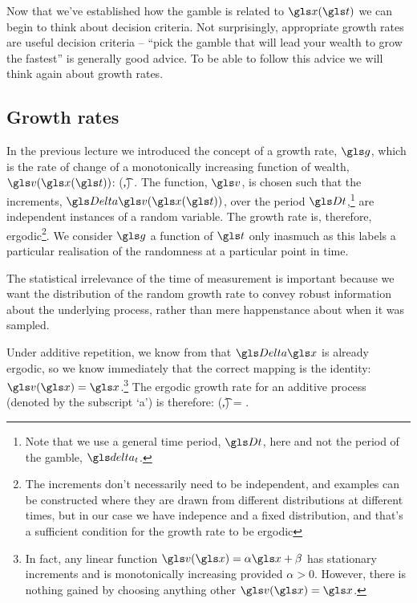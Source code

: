 Now that we've established how the gamble is related to $\x(\t)$ we can 
begin to think about decision criteria. Not surprisingly, appropriate
growth rates are useful decision criteria -- ``pick the gamble that will lead
your wealth to grow the fastest'' is generally good advice. To be able to 
follow this advice we will think again about growth rates.

\subsection{Growth rates}
In the previous lecture we introduced the concept of a growth rate, $\g$, which 
is the rate of change of a monotonically increasing function of wealth, $\gv(\x(\t))$:
\be
\g(\t,\Dt) \equiv \frac{\D \gv(\x(\t))}{\Dt}.
\ee
The function, $\gv$, is chosen such that the increments, $\D \gv(\x(\t))$, over 
the period $\Dt$,\footnote{Note that we use a general time period, $\Dt$, here 
and not the period of the gamble, $\dt$.} are independent instances of a random variable. The growth rate is, therefore, ergodic\footnote{The increments don't necessarily need to be independent, and examples can be constructed where they are drawn from different distributions at different times, but in our case we have indepence and a fixed distribution, and that's a sufficient condition for the growth rate to be ergodic}. We consider $\g$ a function of $\t$ only 
inasmuch as this labels a particular realisation of the randomness at a particular point in time.

The statistical irrelevance of the time of measurement is 
important because we want the distribution of the random growth rate 
to convey robust information about the underlying process, rather than 
mere happenstance about when it was sampled. 

Under additive repetition, we know from  that $\D\x$ is already ergodic, so we know immediately that the correct mapping is the identity: $\gv(\x)=\x$.\footnote{In fact, any linear function $\gv(\x)=\alpha\x+\beta$ has stationary increments and is monotonically increasing provided $\alpha>0$. However, there is nothing gained by choosing anything other $\gv(\x)=\x$.} The ergodic growth rate for an additive process (denoted by the subscript `a') is therefore:
\be
\gad(\t,\Dt) = \frac{\D\x(\t)}{\Dt}.
\ee

